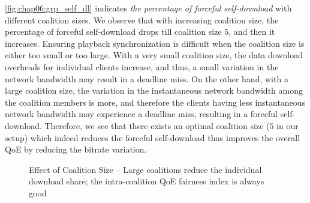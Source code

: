 \fig\ref{fig:chap06:grp_self_dl} indicates \textit{the percentage of forceful self-download} with different coalition sizes. We observe that with increasing coalition size, the percentage of forceful self-download drops till coalition size $5$, and then it increases. Ensuring playback synchronization is difficult when the coalition size is either too small or too large. With a very small coalition size, the data download overheads for individual clients increase, and thus, a small variation in the network bandwidth may result in a deadline miss. On the other hand, with a large coalition size, the variation in the instantaneous network bandwidth among the coalition members is more, and therefore the clients having less instantaneous network bandwidth may experience a deadline miss, resulting in a forceful self-download. Therefore, we see that there exists an optimal coalition size ($5$ in our setup) which indeed reduces the forceful self-download thus improves the overall \ac{QoE} by reducing the bitrate variation.    


\begin{figure}[!ht]
	\captionsetup[subfigure]{width=0.49\linewidth}
	\begin{center}
	\end{center}
	\caption{\label{fig:chap06:grp_contri_n_force}Effect of Coalition Size -- Large coalitions reduce the individual download share; the intra-coalition \acs{QoE} fairness index is always good}
\end{figure}

